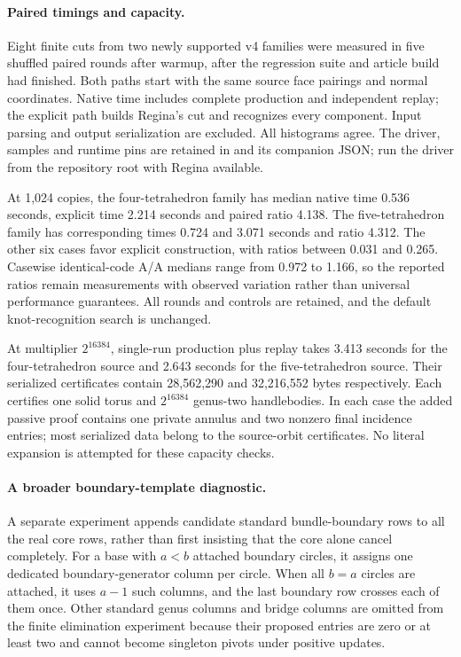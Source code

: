\paragraph{Paired timings and capacity.}
Eight finite cuts from two newly supported v4 families were measured in five
shuffled paired rounds after warmup, after the regression suite and article
build had finished. Both paths start with the same source face pairings and
normal coordinates. Native time includes complete production and independent
replay; the explicit path builds Regina's cut and recognizes every component.
Input parsing and output serialization are excluded. All histograms agree.
The driver, samples and runtime pins are retained in
 and its companion JSON; run the driver
from the repository root with Regina available.



At 1,024 copies, the four-tetrahedron family has median native time 0.536
seconds, explicit time 2.214 seconds and paired ratio 4.138. The
five-tetrahedron family has corresponding times 0.724 and 3.071 seconds and
ratio 4.312. The other six cases favor explicit construction, with ratios
between 0.031 and 0.265. Casewise identical-code A/A medians range from
0.972 to 1.166, so the reported ratios remain measurements with observed
variation rather than universal performance guarantees. All rounds and
controls are retained, and the default knot-recognition search is unchanged.

At multiplier $2^{16384}$, single-run production plus replay takes 3.413
seconds for the four-tetrahedron source and 2.643 seconds for the
five-tetrahedron source. Their serialized certificates contain 28,562,290
and 32,216,552 bytes respectively. Each certifies one solid torus and
$2^{16384}$ genus-two handlebodies. In each case the added passive proof
contains one private annulus and two nonzero final incidence entries; most
serialized data belong to the source-orbit certificates. No literal expansion
is attempted for these capacity checks.

\paragraph{A broader boundary-template diagnostic.}
A separate experiment appends candidate standard bundle-boundary rows to
all the real core rows, rather than first insisting that the core alone
cancel completely. For a base with $a<b$ attached boundary circles, it assigns
one dedicated boundary-generator column per circle. When all $b=a$ circles
are attached, it uses $a-1$ such columns, and the last boundary row crosses
each of them once. Other standard genus columns and bridge columns are
omitted from the finite elimination experiment because their proposed
entries are zero or at least two and cannot become singleton pivots under
positive updates.

